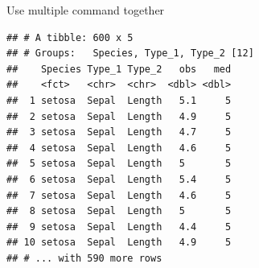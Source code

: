\documentclass[14pt,ignorenonframetext,]{bredelebeamer}
\newenvironment{Shaded}{\begin{snugshade}}{\end{snugshade}}
\newcommand{\KeywordTok}[1]{\textcolor[rgb]{0.94,0.87,0.69}{#1}}
\newcommand{\DataTypeTok}[1]{\textcolor[rgb]{0.87,0.87,0.75}{#1}}
\newcommand{\DecValTok}[1]{\textcolor[rgb]{0.86,0.86,0.80}{#1}}
\newcommand{\CharTok}[1]{\textcolor[rgb]{0.86,0.64,0.64}{#1}}
\newcommand{\StringTok}[1]{\textcolor[rgb]{0.80,0.58,0.58}{#1}}
\newcommand{\OperatorTok}[1]{\textcolor[rgb]{0.94,0.94,0.82}{#1}}
\newcommand{\NormalTok}[1]{\textcolor[rgb]{0.80,0.80,0.80}{#1}}
\begin{document}
\begin{frame}[fragile]{Use multiple command together}

\begin{Shaded}
\end{Shaded}

\begin{verbatim}
## # A tibble: 600 x 5
## # Groups:   Species, Type_1, Type_2 [12]
##    Species Type_1 Type_2   obs   med
##    <fct>   <chr>  <chr>  <dbl> <dbl>
##  1 setosa  Sepal  Length   5.1     5
##  2 setosa  Sepal  Length   4.9     5
##  3 setosa  Sepal  Length   4.7     5
##  4 setosa  Sepal  Length   4.6     5
##  5 setosa  Sepal  Length   5       5
##  6 setosa  Sepal  Length   5.4     5
##  7 setosa  Sepal  Length   4.6     5
##  8 setosa  Sepal  Length   5       5
##  9 setosa  Sepal  Length   4.4     5
## 10 setosa  Sepal  Length   4.9     5
## # ... with 590 more rows
\end{verbatim}

\end{frame}
\end{document}
